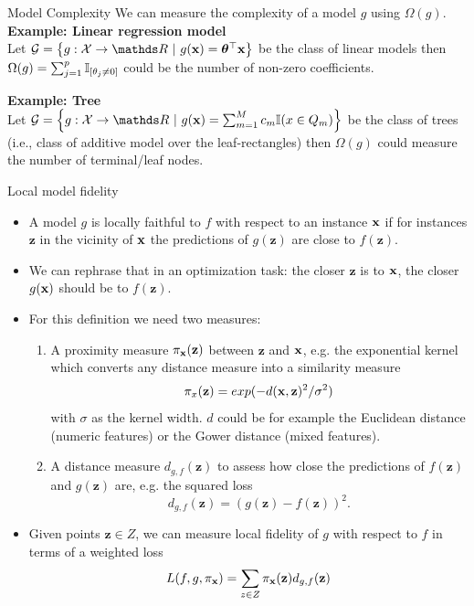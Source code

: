 \documentclass[11pt,compress,t,notes=noshow, xcolor=table]{beamer}
\newcommand{\Gspace}{\mathcal{G}}
\newcommand{\neigh}{\pi_{\xv}}
\newcommand{\zv}{\mathbf{z}}
\begin{document}
\begin{vbframe}{Model Complexity}
We can measure the complexity of a model $g$ using $\Omega(g)$. \\ 
\vspace{0.5cm}
 	\textbf{Example: Linear regression model}\\
 	Let $\Gspace = \left\{g: \Xspace \to \R ~|~g(\xv) = \thetab^\top \xv\right\}$ be the class of linear models then $\Omega(g) = \sum_{j = 1}^p \I_{[\theta_j \neq 0]}$ could be the number of non-zero coefficients. 
 	\vspace{0.5cm}
 	
 	\textbf{Example: Tree}\\
 	Let $\Gspace = \left\{g:\Xspace \to \R ~|~g(\xv) = \sum_{m=1}^M c_m \I(x \in Q_m)\right\}$ be the class of trees (i.e., class of additive model over the leaf-rectangles) then $\Omega(g)$ could measure the number of terminal/leaf nodes.\\
 	\end{vbframe}
 
 	\begin{vbframe}{Local model fidelity}
 		\begin{itemize}
 			\item A model $g$ is locally faithful to $f$ with respect to an instance $\xv$ if for instances $\zv$ in the vicinity of $\xv$ the predictions of $g(\zv)$ are close to $f(\zv)$. 
 			 \item We can rephrase that in an optimization task: the closer $\zv$ is to $\xv$, the closer $g(\xv)$ should be to $f(\zv)$.  
 			\item For this definition we need two measures:
 			\begin{enumerate}
 				\item A proximity measure $\neigh(\zv)$ between $\zv$ and $\xv$, e.g. the exponential kernel which converts any distance measure into a similarity measure 
 				$$\pi_x(\zv) = exp(-d(\xv, \zv)^2/\sigma^2)$$ 
 				with $\sigma$ as the kernel width. $d$ could be for example the Euclidean distance (numeric features) or the Gower distance (mixed features). 
 				\item A distance measure $d_{g, f}(\zv)$ to assess how close the predictions of $f(\zv)$ and $g(\zv)$ are, e.g. the squared loss $$d_{g,f}(\zv) = (g(\zv) - f(\zv))^2.$$ 
 			\end{enumerate}
 			\item Given points $\zv \in Z$, we can measure local fidelity of $g$ with respect to $f$ in terms of a weighted loss
 			$$L(f, g, \neigh) = \sum_{z \in Z} \neigh(\zv) d_{g,f}(\zv)$$
 		\end{itemize}
\end{vbframe}
\end{document}
